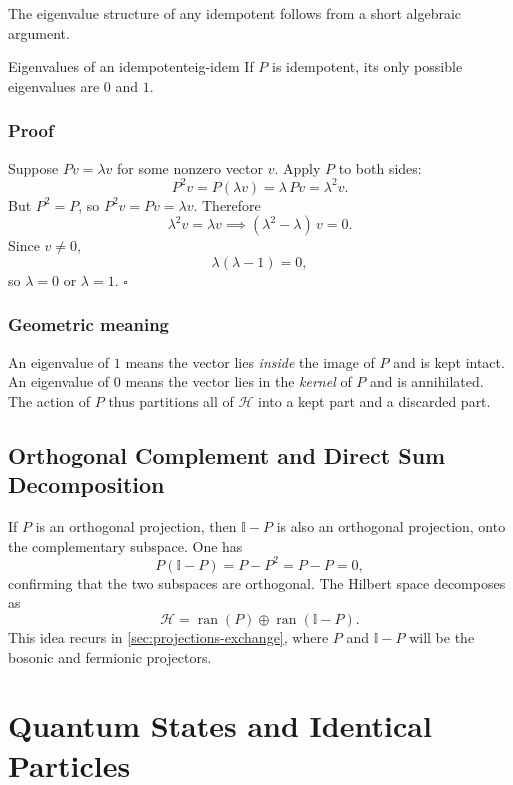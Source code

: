 \documentclass[11pt,a4paper]{article}
\newcommand{\id}{\mathbb{I}}
\newcommand{\hilb}{\mathcal{H}}
\begin{document}
The eigenvalue structure of any idempotent follows from a short algebraic
argument.

\begin{prop}{Eigenvalues of an idempotent}{eig-idem}
  If $P$ is idempotent, its only possible eigenvalues are $0$ and $1$.
\end{prop}

\subsubsection{Proof}

Suppose $Pv = \lambda v$ for some nonzero vector $v$.  Apply $P$ to both sides:
\[
  P^2 v = P(\lambda v) = \lambda\, Pv = \lambda^2 v.
\]
But $P^2 = P$, so $P^2 v = Pv = \lambda v$.  Therefore
\[
  \lambda^2 v = \lambda v \implies (\lambda^2 - \lambda)\,v = 0.
\]
Since $v \neq 0$,
\[
  \lambda(\lambda - 1) = 0,
\]
so $\lambda = 0$ or $\lambda = 1$. $\square$

\subsubsection{Geometric meaning}

An eigenvalue of $1$ means the vector lies \emph{inside} the image of $P$
and is kept intact.  An eigenvalue of $0$ means the vector lies in the
\emph{kernel} of $P$ and is annihilated.  The action of $P$ thus partitions
all of $\hilb$ into a kept part and a discarded part.

\subsection{Orthogonal Complement and Direct Sum Decomposition}

If $P$ is an orthogonal projection, then $\id - P$ is also an orthogonal
projection, onto the complementary subspace.  One has
\[
  P(\id - P) = P - P^2 = P - P = 0,
\]
confirming that the two subspaces are orthogonal.  The Hilbert space decomposes
as
\[
  \hilb = \operatorname{ran}(P) \oplus \operatorname{ran}(\id - P).
\]
This idea recurs in \cref{sec:projections-exchange}, where $P$ and $\id - P$
will be the bosonic and fermionic projectors.

\section{Quantum States and Identical Particles}
\label{sec:qm-identical}
\end{document}

